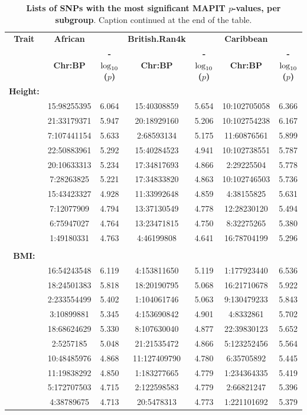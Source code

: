 \documentclass[12pt,a4paper]{article}
\def\log{{\rm log}}
\begin{document}
\begin{landscape}
\setlength{\footskip}{2cm}
\begin{table}[ht]
\centering
\begin{tabular}{ccccccc}
  \hline
  \textbf{Trait} & \textbf{African} & & \textbf{British.Ran4k} & & \textbf{Caribbean} & \\ 
& \textbf{Chr:BP} & \textbf{-$\log_{10}$($p$)} & \textbf{Chr:BP} & \textbf{-$\log_{10}$($p$)} & \textbf{Chr:BP} & \textbf{-$\log_{10}$($p$)} \\ 
  \hline
\textbf{Height:} & & & & & & \\
& 15:98255395 & 6.064 & 15:40308859 & 5.654 & 10:102705058 & 6.366 \\ 
  & 21:33179371 & 5.947 & 20:18929160 & 5.206 & 10:102754238 & 6.167 \\ 
  & 7:107441154 & 5.633 & 2:68593134 & 5.175 & 11:60876561 & 5.899 \\ 
  & 22:50883961 & 5.292 & 15:40284523 & 4.941 & 10:102738551 & 5.787 \\ 
  & 20:10633313 & 5.234 & 17:34817693 & 4.866 & 2:29225504 & 5.778 \\ 
  & 7:28263825 & 5.221 & 17:34833820 & 4.863 & 10:102746503 & 5.736 \\ 
  & 15:43423327 & 4.928 & 11:33992648 & 4.859 & 4:38155825 & 5.631 \\ 
  & 7:12077909 & 4.794 & 13:37130549 & 4.778 & 12:28230120 & 5.494 \\ 
  & 6:75947027 & 4.764 & 13:23471815 & 4.750 & 8:32275265 & 5.380 \\ 
  & 1:49180331 & 4.763 & 4:46199808 & 4.641 & 16:78704199 & 5.296 \\ 
   \\
\textbf{BMI:} & & & & & & \\
& 16:54243548 & 6.119 & 4:153811650 & 5.119 & 1:177923440 & 6.536 \\ 
  & 18:24501383 & 5.818 & 18:20190795 & 5.068 & 16:21710678 & 5.922 \\ 
  & 2:233554499 & 5.402 & 1:104061746 & 5.063 & 9:130479233 & 5.843 \\ 
  & 3:10899881 & 5.345 & 4:153690842 & 4.901 & 4:8332861 & 5.702 \\ 
  & 18:68624629 & 5.330 & 8:107630040 & 4.877 & 22:39830123 & 5.652 \\ 
  & 2:5257185 & 5.048 & 21:21535472 & 4.866 & 5:123252456 & 5.564 \\ 
  & 10:48485976 & 4.868 & 11:127409790 & 4.780 & 6:35705892 & 5.445 \\ 
  & 11:19838292 & 4.850 & 1:183277665 & 4.779 & 1:234364335 & 5.419 \\ 
  & 5:172707503 & 4.715 & 2:122598583 & 4.779 & 2:66821247 & 5.396 \\ 
  & 4:38789675 & 4.713 & 20:5478313 & 4.773 & 1:221101692 & 5.379 \\ 
   \hline
\end{tabular}
\caption[TBD]{\textbf{Lists of SNPs with the most significant MAPIT $p$-values, per subgroup}. Caption continued at the end of the table.}
\label{InterPath-Supp-Table-MAPIT-TopSNPs-a}
\end{table}
\end{landscape}
\end{document}
